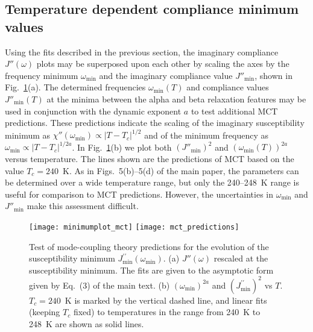 \documentclass[reprint,showpacs,amsmath,amssymb,aip,jcp]{revtex4-1}
\begin{document}
\subsection{Temperature dependent compliance minimum values}

Using the fits described in the previous section, the imaginary
compliance $J''(\omega)$ plots may be superposed upon each other by
scaling the axes by the frequency minimum $\omega_{\text{min}}$ and
the imaginary compliance value $J''_{\text{min}}$, shown in Fig.\
\ref{mct_pl_pred}(a). The determined frequencies
$\omega_\text{min}(T)$ and compliance values $J''_\text{min}(T)$ at
the minima between the alpha and beta relaxation features may be used
in conjunction with the dynamic exponent $a$ to test additional MCT
predictions. These predictions indicate the scaling of the imaginary
susceptibility minimum as $\chi''(\omega_{\textrm{min}}) \propto
\left| T - T_c \right| ^{1/2}$ and of the minimum frequency as
$\omega_{\textrm{min}} \propto \left| T - T_c \right|^{1/2a}$. In
Fig.\ \ref{mct_pl_pred}(b) we plot both $\left( J''_{\textrm{min}}
\right)^2$ and $\left( \omega_{\textrm{min}}(T) \right)^{2a}$ versus
temperature. The lines shown are the predictions of MCT based on the
value $T_c=240$~K. As in Figs.~5(b)--5(d) of the main paper, the
parameters can be determined over a wide temperature range, but only
the 240--248~K range is useful for comparison to MCT
predictions. However, the uncertainties in $\omega_{\textrm{min}}$ and
$J''_{\textrm{min}}$ make this assessment difficult.

\begin{figure}
 \texttt{[image: minimumplot\_mct]}
 \texttt{[image: mct\_predictions]}
 \caption{\label{mct_pl_pred}Test of mode-coupling theory predictions
   for the evolution of the susceptibility minimum
   $J^{\prime\prime}_{\text{min}}(\omega_{\text{min}})$. (a)
   $J''(\omega)$ rescaled at the susceptibility minimum. The fits are
   given to the asymptotic form given by Eq.\ (3) of the main text.
   (b) $(\omega_{\text{min}})^{2a}$ and
   $(J^{\prime\prime}_{\text{min}})^{2}$ vs $T$. $T_c=240$~K is marked
   by the vertical dashed line, and linear fits (keeping $T_c$ fixed)
   to temperatures in the range from 240~K to 248~K are shown as solid
   lines.}
\end{figure}


\clearpage
%

%
\end{document}

